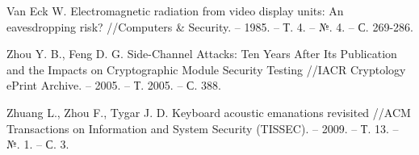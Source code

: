 \begin{thebibliography}{00}
  Van Eck W. Electromagnetic radiation from video display units: An eavesdropping risk? //Computers \& Security. – 1985. – Т. 4. – №. 4. – С. 269-286.

  Zhou Y. B., Feng D. G. Side-Channel Attacks: Ten Years After Its Publication and the Impacts on Cryptographic Module Security Testing //IACR Cryptology ePrint Archive. – 2005. – Т. 2005. – С. 388.

  Zhuang L., Zhou F., Tygar J. D. Keyboard acoustic emanations revisited //ACM Transactions on Information and System Security (TISSEC). – 2009. – Т. 13. – №. 1. – С. 3.

\end{thebibliography}
\endgroup

\clearpage
